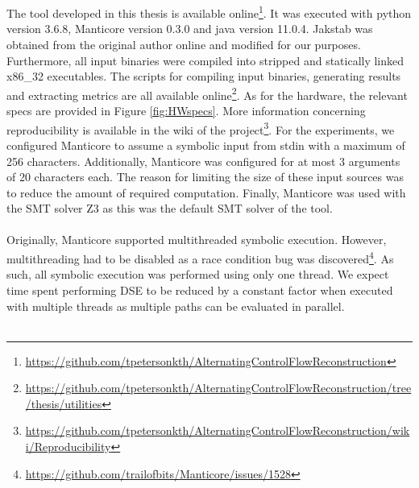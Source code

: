 \documentclass{kththesis}
\begin{document}
\\ \\
The tool developed in this thesis is available online\footnote{\url{https://github.com/tpetersonkth/AlternatingControlFlowReconstruction}}. It was executed with python version 3.6.8, Manticore version 0.3.0 and java version 11.0.4. Jakstab was obtained from the original author online\cite{JakstabGit} and modified for our purposes. Furthermore, all input binaries were compiled into stripped and statically linked x86\_32 executables. The scripts for compiling input binaries, generating results and extracting metrics are all available online\footnote{\url{https://github.com/tpetersonkth/AlternatingControlFlowReconstruction/tree/thesis/utilities}}. As for the hardware, the relevant specs are provided in Figure \ref{fig:HWspecs}. More information concerning reproducibility is available in the wiki of the project\footnote{\url{https://github.com/tpetersonkth/AlternatingControlFlowReconstruction/wiki/Reproducibility}}.
\clearpage
\noindent
For the experiments, we configured Manticore to assume a symbolic input from stdin with a maximum of 256 characters. Additionally, Manticore was configured for at most 3 arguments of 20 characters each. The reason for limiting the size of these input sources was to reduce the amount of required computation. Finally, Manticore was used with the SMT solver Z3 as this was the default SMT solver of the tool.
\\ \\
Originally, Manticore supported multithreaded symbolic execution. However, multithreading had to be disabled as a race condition bug was discovered\footnote{\url{https://github.com/trailofbits/Manticore/issues/1528}}. As such, all symbolic execution was performed using only one thread. We expect time spent performing DSE to be reduced by a constant factor when executed with multiple threads as multiple paths can be evaluated in parallel.
\\ \\
\end{document}
